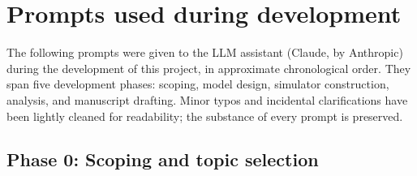 \documentclass[10pt,a4paper,twocolumn]{article}
\begin{document}
\appendix
\section{Prompts used during development}\label{app:prompts}
The following prompts were given to the LLM assistant (Claude, by Anthropic) during the development of this project, in approximate chronological order. They span five development phases: scoping, model design, simulator construction, analysis, and manuscript drafting. Minor typos and incidental clarifications have been lightly cleaned for readability; the substance of every prompt is preserved.

\subsection*{Phase 0: Scoping and topic selection}
\end{document}
